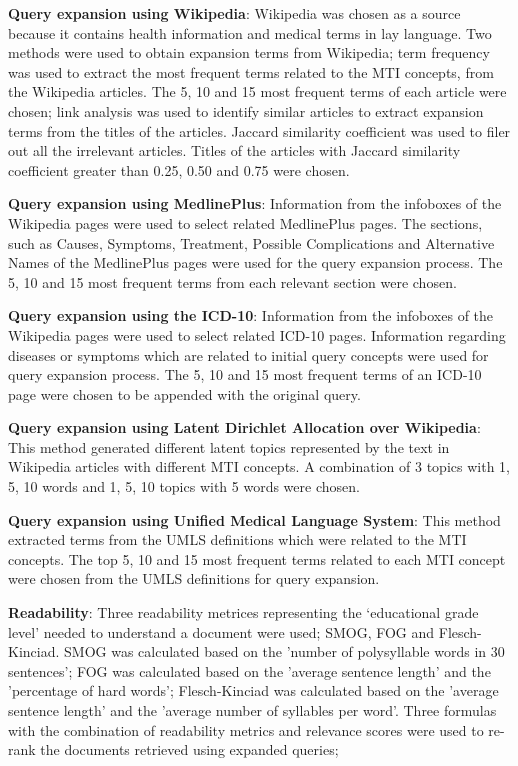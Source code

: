 \documentclass[]{article}
\begin{document}
\textbf{Query expansion using Wikipedia}: Wikipedia was chosen as a source because it contains health information and medical terms in lay language. Two methods were used to obtain expansion terms from Wikipedia; term frequency was used to extract the most frequent terms related to the MTI concepts, from the Wikipedia articles. The 5, 10 and 15 most frequent terms of each article were chosen; link analysis was used to identify similar articles to extract expansion terms from the titles of the articles. Jaccard similarity coefficient was used to filer out all the irrelevant articles. Titles of the articles with Jaccard similarity coefficient greater than 0.25, 0.50 and 0.75 were chosen.              
  
\textbf{Query expansion using MedlinePlus}: Information from the infoboxes of the Wikipedia pages were used to select related MedlinePlus pages. The sections, such as Causes, Symptoms, Treatment, Possible Complications and Alternative Names of the MedlinePlus pages were used for the query expansion process. The 5, 10 and 15 most frequent terms from each relevant section were chosen.       

\textbf{Query expansion using the ICD-10}: Information from the infoboxes of the Wikipedia pages were used to select related ICD-10 pages. Information regarding diseases or symptoms which are related to initial query concepts were used for query expansion process. The 5, 10 and 15 most frequent terms of an ICD-10 page were chosen to be appended with the original query.      

\textbf{Query expansion using Latent Dirichlet Allocation over Wikipedia}: This method generated different latent topics represented by the text in Wikipedia articles with different MTI concepts. A combination of 3 topics with 1, 5, 10 words and 1, 5, 10 topics with 5 words were chosen.     

\textbf{Query expansion using Unified Medical Language System}: This method extracted terms from the UMLS definitions which were related to the MTI concepts. The top 5, 10 and 15 most frequent terms related to each MTI concept were chosen from the UMLS definitions for query expansion.  

\textbf{Readability}: Three readability metrices representing the ‘educational grade level’ needed to understand a document were used; SMOG, FOG and Flesch-Kinciad. SMOG was calculated based on the 'number of polysyllable words in 30 sentences'; FOG was calculated based on the 'average sentence length' and the 'percentage of hard words'; Flesch-Kinciad was calculated based on the 'average sentence length' and the 'average number of syllables per word'. Three formulas with the combination of readability metrics and relevance scores were used to re-rank the documents retrieved using expanded queries; 
\end{document}
